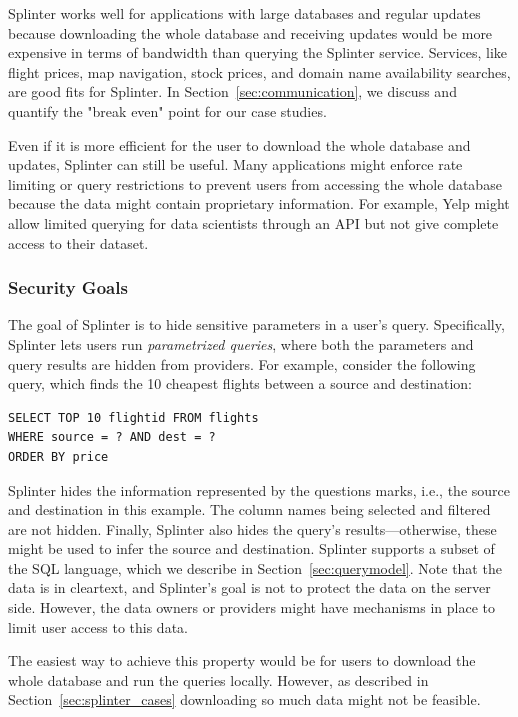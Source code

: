 Splinter works well for applications with large databases
and regular updates because downloading the whole
database and receiving updates would be more expensive in terms
of bandwidth than querying the Splinter service. Services,
like flight prices, map navigation, stock prices, 
and domain name availability searches, are good fits for Splinter.
In Section~\ref{sec:communication}, we discuss and 
quantify the "break even" point for our case studies.

Even if it is more efficient for the user to download the whole
database and updates, Splinter can still be useful.
Many applications might enforce rate limiting or query restrictions
to prevent users from accessing the whole database
because the data might contain proprietary information.
For example, Yelp might allow limited querying
for data scientists through an API but not give complete access to their dataset. 

\subsubsection{Security Goals}
\label{sec:query_model}
The goal of Splinter is to hide sensitive parameters in
a user's query.
Specifically, Splinter lets users run \emph{parametrized queries}, 
where both the parameters and query results are hidden from providers.
For example, consider the following query, which finds the 10 cheapest flights between a source and destination:
\begin{verbatim}
SELECT TOP 10 flightid FROM flights
WHERE source = ? AND dest = ? 
ORDER BY price
\end{verbatim}
Splinter hides the information represented by the questions marks, i.e.,
the source and destination in this example.
The column names being selected and filtered are not hidden.
Finally, Splinter also hides the query's results---otherwise,
these might be used to infer the source and destination. 
Splinter supports a subset of the SQL language, which we describe in Section~\ref{sec:querymodel}.
Note that the data is in cleartext, and Splinter's goal is not to protect the data on 
the server side. However, the data owners or providers might have 
mechanisms in place to limit user access to this data.

The easiest way to achieve this property would be for users to download the whole database
and run the queries locally. However, as described in Section~\ref{sec:splinter_cases}
downloading so much data might not be feasible. 

